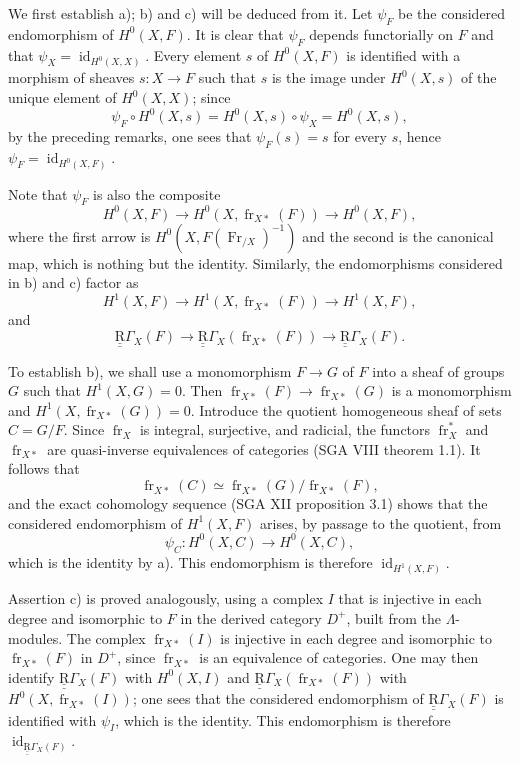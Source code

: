 \documentclass[11pt]{article}
\providecommand{\id}{\operatorname{id}}
\providecommand{\id}{\operatorname{id}}
\providecommand{\id}{\operatorname{id}}
\providecommand{\id}{\operatorname{id}}
\providecommand{\id}{\operatorname{id}}
\providecommand{\fr}{\operatorname{fr}}
\providecommand{\Fr}{\operatorname{Fr}}
\providecommand{\Fr}{\operatorname{Fr}}
\providecommand{\fr}{\operatorname{fr}}
\providecommand{\id}{\operatorname{id}}
\begin{document}
We first establish a); b) and c) will be deduced from it. Let $\psi_F$ be the considered endomorphism of $H^0(X,F)$. It is clear that $\psi_F$ depends functorially on $F$ and that $\psi_X=\id_{H^0(X,X)}$. Every element $s$ of $H^0(X,F)$ is identified with a morphism of sheaves $s:X\to F$ such that $s$ is the image under $H^0(X,s)$ of the unique element of $H^0(X,X)$; since
\[
\psi_F\circ H^0(X,s)=H^0(X,s)\circ\psi_X=H^0(X,s),
\]
by the preceding remarks, one sees that $\psi_F(s)=s$ for every $s$, hence $\psi_F=\id_{H^0(X,F)}$.

Note that $\psi_F$ is also the composite
\[
H^0(X,F)\longrightarrow H^0(X,\fr_{X*}(F))
\longrightarrow H^0(X,F),
\]
where the first arrow is $H^0(X,F(\Fr_{/X})^{-1})$ and the second is the canonical map, which is nothing but the identity. Similarly, the endomorphisms considered in b) and c) factor as
\[
H^1(X,F)\longrightarrow H^1(X,\fr_{X*}(F))
\longrightarrow H^1(X,F),
\]
and
\[
\underline{\underline{\mathrm{R}}}\Gamma_X(F)\longrightarrow \underline{\underline{\mathrm{R}}}\Gamma_X(\fr_{X*}(F))
\longrightarrow \underline{\underline{\mathrm{R}}}\Gamma_X(F).
\]

To establish b), we shall use a monomorphism $F\to G$ of $F$ into a sheaf of groups $G$ such that $H^1(X,G)=0$. Then $\fr_{X*}(F)\to\fr_{X*}(G)$ is a monomorphism and $H^1(X,\fr_{X*}(G))=0$. Introduce the quotient homogeneous sheaf of sets $C=G/F$. Since $\fr_X$ is integral, surjective, and radicial, the functors $\fr_X^*$ and $\fr_{X*}$ are quasi-inverse equivalences of categories (SGA VIII theorem 1.1). It follows that
\[
\fr_{X*}(C)\simeq\fr_{X*}(G)/\fr_{X*}(F),
\]
and the exact cohomology sequence (SGA XII proposition 3.1) shows that the considered endomorphism of $H^1(X,F)$ arises, by passage to the quotient, from
\[
\psi_C:H^0(X,C)\longrightarrow H^0(X,C),
\]
which is the identity by a). This endomorphism is therefore $\id_{H^1(X,F)}$.

Assertion c) is proved analogously, using a complex $I$ that is injective in each degree and isomorphic to $F$ in the derived category $D^+$, built from the $\Lambda$-modules. The complex $\fr_{X*}(I)$ is injective in each degree and isomorphic to $\fr_{X*}(F)$ in $D^+$, since $\fr_{X*}$ is an equivalence of categories. One may then identify $\underline{\underline{\mathrm{R}}}\Gamma_X(F)$ with $H^0(X,I)$ and $\underline{\underline{\mathrm{R}}}\Gamma_X(\fr_{X*}(F))$ with $H^0(X,\fr_{X*}(I))$; one sees that the considered endomorphism of $\underline{\underline{\mathrm{R}}}\Gamma_X(F)$ is identified with $\psi_I$, which is the identity. This endomorphism is therefore $\id_{\underline{\underline{\mathrm{R}}}\Gamma_X(F)}$.
\end{document}
